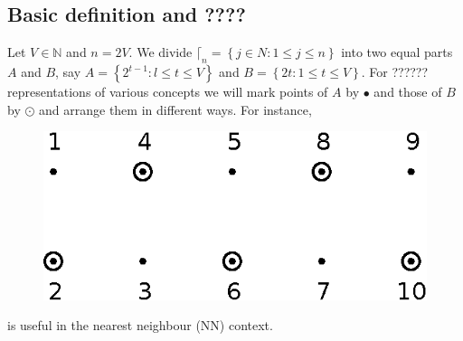 \documentclass[a4paper,12pt]{article}
\theoremstyle{definition}
\theoremstyle{underlinethm}
\theoremstyle{underline}
\begin{document}
\subsection{Basic definition and ????}\label{subsection-3.1}

Let $V \in \mathbb{N}$ and $n=2V$. We divide $\lceil_{n} = \left\{j \in N : 1 \leq j \leq n\right\}$ into two equal parts $A$ and $B$, say $A = \left\{2^{t-1} : l \leq t \leq V\right\}$ and $B = \left\{ 2t : 1 \leq t \leq V \right\}$. For ?????? representations of various concepts we will mark points of $A$ by $\bullet$ and those of $B$ by $\odot$ and arrange them in different ways. For instance,

\begin{figure}
\centering
\includegraphics[scale=.8]{figure/fig2.eps}
\caption{}\label{fig02}
\end{figure}

is useful in the nearest neighbour (NN) context.
\end{document}
